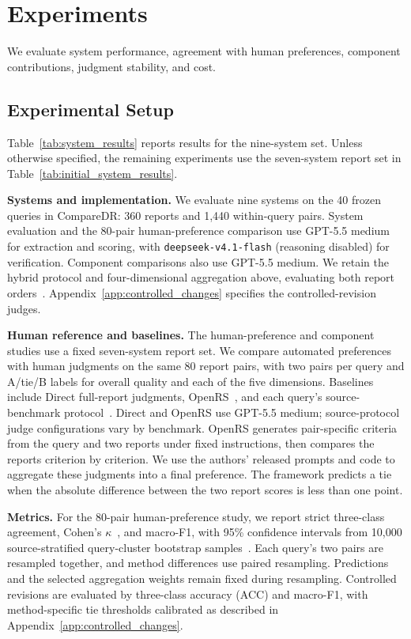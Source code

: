 \documentclass{article}
\begin{document}
\section{Experiments}
\label{sec:experiments}
We evaluate system performance, agreement with human preferences, component contributions, judgment stability, and cost.

\subsection{Experimental Setup}
\label{sec:experimental_setup}
Table~\ref{tab:system_results} reports results for the nine-system set. Unless otherwise specified, the remaining experiments use the seven-system report set in Table~\ref{tab:initial_system_results}.

\textbf{Systems and implementation.}
We evaluate nine systems on the 40 frozen queries in CompareDR: 360 reports and 1,440 within-query pairs. System evaluation and the 80-pair human-preference comparison use GPT-5.5 medium for extraction and scoring, with \texttt{deepseek-v4.1-flash} (reasoning disabled) for verification. Component comparisons also use GPT-5.5 medium. We retain the hybrid protocol and four-dimensional aggregation above, evaluating both report orders~\citep{faireval2023,judgingjudge2025}. Appendix~\ref{app:controlled_changes} specifies the controlled-revision judges.

\textbf{Human reference and baselines.}
The human-preference and component studies use a fixed seven-system report set. We compare automated preferences with human judgments on the same 80 report pairs, with two pairs per query and A/tie/B labels for overall quality and each of the five dimensions. Baselines include Direct full-report judgments, OpenRS~\citep{openrs2026}, and each query's source-benchmark protocol~\citep{drb12025,drb22026,ResearchRubrics2025}. Direct and OpenRS use GPT-5.5 medium; source-protocol judge configurations vary by benchmark. OpenRS generates pair-specific criteria from the query and two reports under fixed instructions, then compares the reports criterion by criterion. We use the authors' released prompts and code to aggregate these judgments into a final preference. The framework predicts a tie when the absolute difference between the two report scores is less than one point.

\textbf{Metrics.}
For the 80-pair human-preference study, we report strict three-class agreement, Cohen's $\kappa$~\citep{cohen1960agreement}, and macro-F1, with 95\% confidence intervals from 10,000 source-stratified query-cluster bootstrap samples~\citep{davisonhinkley1997bootstrap}. Each query's two pairs are resampled together, and method differences use paired resampling. Predictions and the selected aggregation weights remain fixed during resampling. Controlled revisions are evaluated by three-class accuracy (ACC) and macro-F1, with method-specific tie thresholds calibrated as described in Appendix~\ref{app:controlled_changes}.
\end{document}
